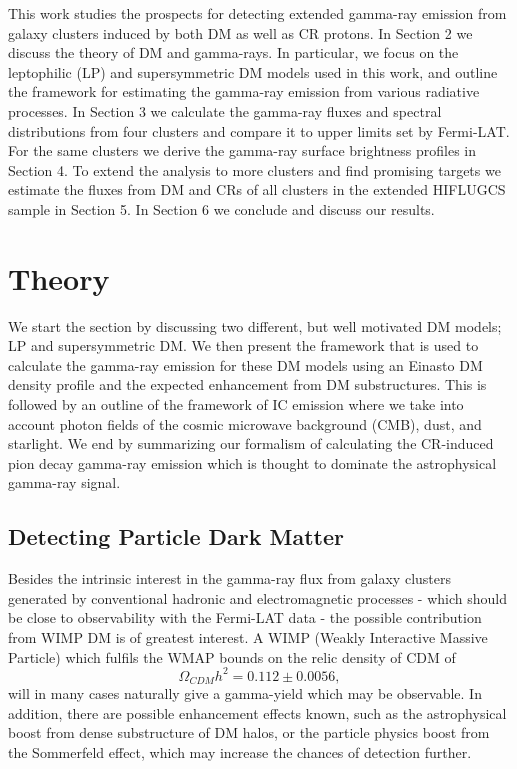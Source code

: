 \documentclass[10pt,aps,pra,reprint,amsmath,amsfonts,amssymb,showpacs,nofootinbib,floatfix]{revtex4-1}
\begin{document}
This work studies the prospects for detecting extended gamma-ray
emission from galaxy clusters induced by both DM as well as CR
protons. In Section 2 we discuss the theory of DM and gamma-rays. In
particular, we focus on the leptophilic (LP) and supersymmetric DM
models used in this work, and outline the framework for estimating the
gamma-ray emission from various radiative processes. In Section 3 we
calculate the gamma-ray fluxes and spectral distributions from four
clusters and compare it to upper limits set by Fermi-LAT. For the same
clusters we derive the gamma-ray surface brightness profiles in
Section 4. To extend the analysis to more clusters and find promising
targets we estimate the fluxes from DM and CRs of all clusters in the
extended HIFLUGCS sample in Section 5. In Section 6 we conclude and
discuss our results.

\section{Theory}
\label{sect:theory}
We start the section by discussing two different, but well motivated
DM models; LP and supersymmetric DM. We then present the framework
that is used to calculate the gamma-ray emission for these DM models
using an Einasto DM density profile and the expected enhancement from
DM substructures. This is followed by an outline of the framework of
IC emission where we take into account photon fields of the cosmic
microwave background (CMB), dust, and starlight. We end by summarizing
our formalism of calculating the CR-induced pion decay gamma-ray
emission which is thought to dominate the astrophysical gamma-ray
signal.


\subsection{Detecting Particle Dark Matter}
\label{sect:PF}
Besides the intrinsic interest in the gamma-ray flux from galaxy
clusters generated by conventional hadronic and electromagnetic
processes - which should be close to observability with the Fermi-LAT
data
\cite{1997ApJ...487..529B,2007A&A...473...41E,2010MNRAS.409..449P} -
the possible contribution from WIMP DM is of greatest interest. A WIMP
(Weakly Interactive Massive Particle) which fulfils the WMAP bounds on
the relic density of CDM of \cite{Komatsu:2010fb}
$$\Omega_{CDM}h^2=0.112\pm 0.0056,$$ will in many cases naturally give
a gamma-yield which may be observable. In addition, there are possible
enhancement effects known, such as the astrophysical boost from dense
substructure of DM halos, or the particle physics boost from the
Sommerfeld effect, which may increase the chances of detection
further.
\end{document}
